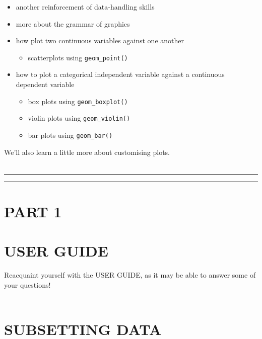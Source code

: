 \documentclass[
]{book}
\providecommand{\tightlist}{%
  \setlength{\itemsep}{0pt}\setlength{\parskip}{0pt}}
\begin{document}
\begin{itemize}
\tightlist
\item
  another reinforcement of data-handling skills
\item
  more about the grammar of graphics
\item
  how plot two continuous variables against one another

  \begin{itemize}
  \tightlist
  \item
    scatterplots using \texttt{geom\_point()}
  \end{itemize}
\item
  how to plot a categorical independent variable against a continuous dependent variable

  \begin{itemize}
  \tightlist
  \item
    box plots using \texttt{geom\_boxplot()}
  \item
    violin plots using \texttt{geom\_violin()}
  \item
    bar plots using \texttt{geom\_bar()}
  \end{itemize}
\end{itemize}

We'll also learn a little more about customising plots.\\
~\\

\begin{center}\rule{0.5\linewidth}{0.5pt}\end{center}

\begin{center}\rule{0.5\linewidth}{0.5pt}\end{center}

\hypertarget{part-1}{%
\section{PART 1}\label{part-1}}

\hypertarget{user-guide}{%
\section{USER GUIDE}\label{user-guide}}

Reacquaint yourself with the USER GUIDE, as it may be able to answer some of
your questions!\\
~\\

\hypertarget{subsetting-data}{%
\section{SUBSETTING DATA}\label{subsetting-data}}
\end{document}
